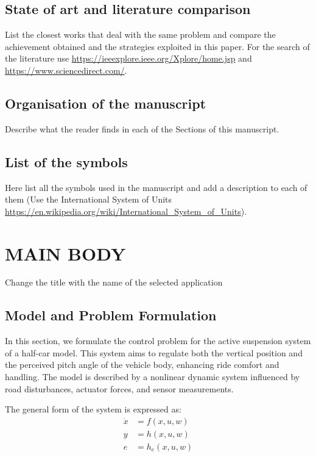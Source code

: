 \documentclass[]{report}
\begin{document}
\section{State of art and literature comparison}
List the closest works that deal with the same problem and compare the achievement obtained and the strategies exploited in this paper. For the search of the literature use \url{https://ieeexplore.ieee.org/Xplore/home.jsp} and \url{https://www.sciencedirect.com/}.

\section{Organisation of the manuscript}
Describe what the reader finds in each of the Sections of this manuscript.

\section{List of the symbols}
Here list all the symbols used in the manuscript and add a description to each of them (Use the International System of Units \url{https://en.wikipedia.org/wiki/International_System_of_Units}).

\chapter{MAIN BODY}
Change the title with the name of the selected application

\section{Model and Problem Formulation}
In this section, we formulate the control problem for the active suspension system of a half-car model. This system aims to regulate both the vertical position and the perceived pitch angle of the vehicle body, enhancing ride comfort and handling. The model is described by a nonlinear dynamic system influenced by road disturbances, actuator forces, and sensor measurements.

The general form of the system is expressed as:
\begin{align}
	\dot{x} &= f(x, u, w) \\
	y &= h(x, u, w) \\
	e &= h_e(x, u, w)
\end{align}
\end{document}
